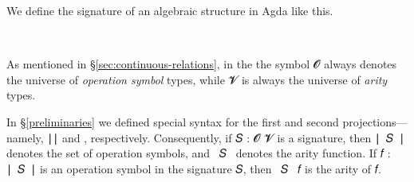 
We define the signature of an algebraic structure in Agda like this.
\ccpad
\begin{code}%
\>[0]\AgdaSpace{}%
\AgdaSymbol{:}\AgdaSpace{}%
\AgdaSymbol{(}\AgdaSpace{}%
\AgdaSpace{}%
\AgdaSymbol{:}\AgdaSpace{}%
\AgdaSymbol{)}\AgdaSpace{}%
\AgdaSpace{}%
\AgdaSymbol{(}\AgdaSpace{}%
\AgdaSpace{}%
\AgdaSymbol{)}\AgdaSpace{}%
\AgdaSpace{}%
\<%
\\
\>[0]\AgdaSpace{}%
\AgdaSpace{}%
\AgdaSpace{}%
\AgdaSymbol{=}\AgdaSpace{}%
\AgdaSpace{}%
\AgdaSpace{}%
\AgdaSpace{}%
\AgdaSpace{}%
\AgdaSpace{}%
\AgdaFunction{,}\AgdaSpace{}%
\AgdaSymbol{(}\AgdaSpace{}%
\AgdaSpace{}%
\AgdaSpace{}%
\AgdaSymbol{)}\<%
\end{code}
\ccpad
As mentioned in \S\ref{sec:continuous-relations}, in the \ualib the symbol 𝓞 always denotes the universe of \emph{operation symbol} types, while 𝓥 is always the universe of \emph{arity} types.

In \S\ref{preliminaries} we defined special syntax for the first and second projections---namely, \af ∣\au\af ∣ and \au{}, respectively. Consequently, if \ab 𝑆 \as :  \ab 𝓞 \ab 𝓥 is a signature, then \af ∣~\ab 𝑆~\af ∣ denotes the set of operation symbols, and ~\ab 𝑆~ denotes the arity function. If \ab 𝑓 \as : \af ∣~\ab 𝑆~\af ∣ is an operation symbol in the signature \ab 𝑆, then ~\ab 𝑆~ \ab 𝑓 is the arity of \ab 𝑓.



